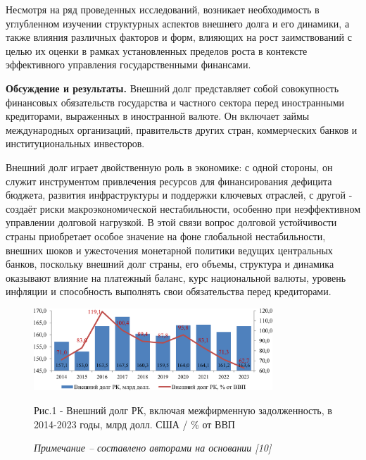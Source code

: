 \begin{multicols}{2}
Несмотря на ряд проведенных исследований, возникает необходимость в
углубленном изучении структурных аспектов внешнего долга и его динамики,
а также влияния различных факторов и форм, влияющих на рост
заимствований с целью их оценки в рамках установленных пределов роста в
контексте эффективного управления государственными финансами.

{\bfseries Обсуждение и результаты.} Внешний долг представляет собой
совокупность финансовых обязательств государства и частного сектора
перед иностранными кредиторами, выраженных в иностранной валюте. Он
включает займы международных организаций, правительств других стран,
коммерческих банков и институциональных инвесторов.

Внешний долг играет двойственную роль в экономике: с одной стороны, он
служит инструментом привлечения ресурсов для финансирования дефицита
бюджета, развития инфраструктуры и поддержки ключевых отраслей, с другой
- создаёт риски макроэкономической нестабильности, особенно при
неэффективном управлении долговой нагрузкой. В этой связи вопрос
долговой устойчивости страны приобретает особое значение на фоне
глобальной нестабильности, внешних шоков и ужесточения монетарной
политики ведущих центральных банков, поскольку внешний долг страны, его
объемы, структура и динамика оказывают влияние на платежный баланс, курс
национальной валюты, уровень инфляции и способность выполнять свои
обязательства перед кредиторами.
\end{multicols}

\begin{figure}[H]
	\centering
	\includegraphics[width=0.8\textwidth]{media/ekon4/image12}
	\caption*{Рис.1 - Внешний долг РК, включая межфирменную задолженность, в 2014-2023 годы, млрд долл. США / \% от ВВП}
	\caption*{\normalfont\emph{Примечание -- составлено авторами на основании {[}10{]}}}
\end{figure}

